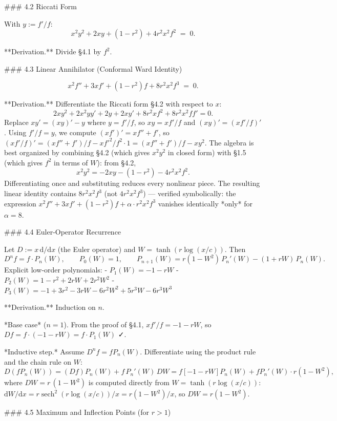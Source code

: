 ### 4.2 Riccati Form

With $y := f'/f$:
$$
x^{2}y^{2} + 2xy + (1-r^{2}) + 4r^{2}x^{2}f^{2} \;=\; 0.
$$

**Derivation.** Divide §4.1 by $f^{2}$.

### 4.3 Linear Annihilator (Conformal Ward Identity)

$$
\boxed{\;x^{2}f'' + 3xf' + (1-r^{2})f + 8r^{2}x^{2}f^{3} \;=\; 0.\;}
$$

**Derivation.** Differentiate the Riccati form §4.2 with respect to $x$:
$$
2x y^{2} + 2x^{2}y y' + 2y + 2xy' + 8r^{2}xf^{2} + 8r^{2}x^{2}f f' = 0.
$$
Replace $xy' = (xy)' - y$ where $y = f'/f$, so $xy = xf'/f$ and $(xy)' = (xf'/f)'$. Using $f'/f = y$, we compute $(xf')' = xf''+f'$, so $(xf'/f)' = (xf''+f')/f - xf'^{2}/f^{2}\cdot 1 = (xf''+f')/f - xy^{2}$. The algebra is best organized by combining §4.2 (which gives $x^{2}y^{2}$ in closed form) with §1.5 (which gives $f^{2}$ in terms of $W$): from §4.2,
$$
x^{2}y^{2} = -2xy - (1-r^{2}) - 4r^{2}x^{2}f^{2}.
$$
Differentiating once and substituting reduces every nonlinear piece. The resulting linear identity contains $8r^{2}x^{2}f^{3}$ (not $4r^{2}x^{2}f^{3}$) — verified symbolically: the expression $x^{2}f''+3xf'+(1-r^{2})f+\alpha\cdot r^{2}x^{2}f^{3}$ vanishes identically *only* for $\alpha=8$.

### 4.4 Euler‑Operator Recurrence

Let $D := x\,\mathrm d/\mathrm dx$ (the Euler operator) and $W = \tanh(r\log(x/c))$. Then
$$
D^{n}f = f\cdot P_{n}(W),\qquad P_{0}(W)=1,\qquad P_{n+1}(W) = r(1-W^{2})\,P_{n}'(W) - (1+rW)\,P_{n}(W).
$$
Explicit low‑order polynomials:
- $P_{1}(W) = -1 - rW$
- $P_{2}(W) = 1 - r^{2} + 2rW + 2r^{2}W^{2}$
- $P_{3}(W) = -1 + 3r^{2} - 3rW - 6r^{2}W^{2} + 5r^{3}W - 6r^{3}W^{3}$

**Derivation.** Induction on $n$.

*Base case* ($n=1$). From the proof of §4.1, $xf'/f = -1-rW$, so $Df = f\cdot(-1-rW) = f\cdot P_{1}(W)$ ✓.

*Inductive step.* Assume $D^{n}f = f P_{n}(W)$. Differentiate using the product rule and the chain rule on $W$:
$$
D(f P_{n}(W)) = (Df)P_{n}(W) + f\,P_{n}'(W)\,DW = f[-1-rW]P_{n}(W) + f P_{n}'(W)\cdot r(1-W^{2}),
$$
where $DW = r\,(1-W^{2})$ is computed directly from $W=\tanh(r\log(x/c))$: $\mathrm dW/\mathrm dx = r\operatorname{sech}^{2}(r\log(x/c))/x = r(1-W^{2})/x$, so $DW = r(1-W^{2})$.

### 4.5 Maximum and Inflection Points (for $r>1$)

